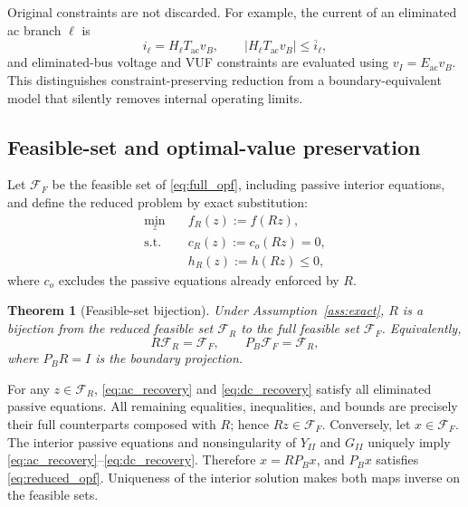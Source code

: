 \documentclass[journal,10pt]{IEEEtran}
\newcommand{\ac}{\mathrm{ac}}
\newcommand{\cF}{\mathcal{F}}
\newtheorem{theorem}{Theorem}
\begin{document}
Original constraints are not discarded.  For example, the current of an
eliminated ac branch $\ell$ is
\begin{equation}
 i_\ell=H_\ell T_{\ac}v_B,\qquad
 |H_\ell T_{\ac}v_B|\leq \overline{i}_\ell,          \label{eq:recovered_current}
\end{equation}
and eliminated-bus voltage and VUF constraints are evaluated using
$v_I=E_{\ac}v_B$.  This distinguishes constraint-preserving reduction from a
boundary-equivalent model that silently removes internal operating limits.

\subsection{Feasible-set and optimal-value preservation}
Let $\cF_F$ be the feasible set of \eqref{eq:full_opf}, including passive
interior equations, and define the reduced problem by exact substitution:
\begin{subequations}\label{eq:reduced_opf}
\begin{align}
 \min_z\quad & f_R(z):=f(Rz),\\
 \mathrm{s.t.}\quad & c_R(z):=c_o(Rz)=0,\\
 & h_R(z):=h(Rz)\leq0,
\end{align}
\end{subequations}
where $c_o$ excludes the passive equations already enforced by $R$.

\begin{theorem}[Feasible-set bijection]\label{thm:feasible}
Under Assumption~\ref{ass:exact}, $R$ is a bijection from the reduced feasible
set $\cF_R$ to the full feasible set $\cF_F$.  Equivalently,
\begin{equation}
 R\cF_R=\cF_F,\qquad P_B\cF_F=\cF_R,
\end{equation}
where $P_B R=I$ is the boundary projection.
\end{theorem}

\begin{IEEEproof}
For any $z\in\cF_R$, \eqref{eq:ac_recovery} and
\eqref{eq:dc_recovery} satisfy all eliminated passive equations.  All remaining
equalities, inequalities, and bounds are precisely their full counterparts
composed with $R$; hence $Rz\in\cF_F$.  Conversely, let $x\in\cF_F$.  The
interior passive equations and nonsingularity of $Y_{II}$ and $G_{II}$ uniquely
imply \eqref{eq:ac_recovery}--\eqref{eq:dc_recovery}.  Therefore
$x=RP_Bx$, and $P_Bx$ satisfies \eqref{eq:reduced_opf}.  Uniqueness of the
interior solution makes both maps inverse on the feasible sets.
\end{IEEEproof}
\end{document}
